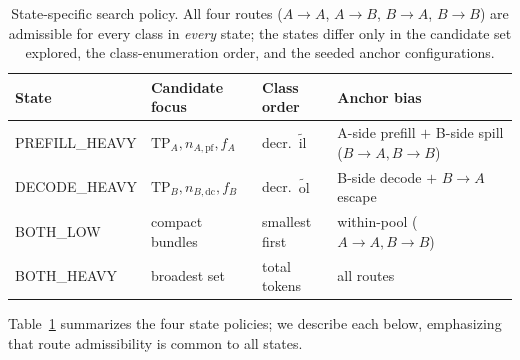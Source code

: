 \begin{table}[t]
\centering
\small
\caption{State-specific search policy. All four routes ($A{\to}A$, $A{\to}B$, $B{\to}A$, $B{\to}B$) are admissible for every class in \emph{every} state; the states differ only in the candidate set explored, the class-enumeration order, and the seeded anchor configurations.}
\label{tab:state_policy}
\begin{tabular}{@{}lllp{2.5cm}@{}}
\toprule
State & Candidate focus & Class order & Anchor bias \\
\midrule
PREFILL\_HEAVY & $\mathrm{TP}_A,n_{A,\mathrm{pf}},f_A$ & decr.\ $\tilde{\mathrm{il}}$ & A-side prefill $+$ B-side spill ($B{\to}A,B{\to}B$) \\
DECODE\_HEAVY & $\mathrm{TP}_B,n_{B,\mathrm{dc}},f_B$ & decr.\ $\tilde{\mathrm{ol}}$ & B-side decode $+$ $B{\to}A$ escape \\
BOTH\_LOW & compact bundles & smallest first & within-pool ($A{\to}A,B{\to}B$) \\
BOTH\_HEAVY & broadest set & total tokens & all routes \\
\bottomrule
\end{tabular}
\end{table}

Table~\ref{tab:state_policy} summarizes the four state policies; we describe each below, emphasizing that route admissibility is common to all states.

